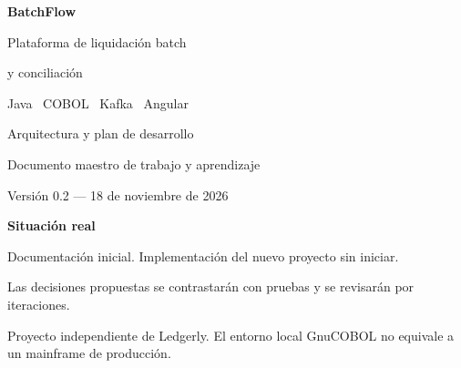 \documentclass[11pt,a4paper,oneside]{report}
\begin{document}
\hypersetup{pageanchor=false}
\begin{titlepage}
\vspace*{18mm}
{\Huge\bfseries\color{brand} BatchFlow\par}
\vspace{8mm}
{\Large Plataforma de liquidación batch\par y conciliación\par}
\vspace{10mm}
{\large Java \textperiodcentered\ COBOL \textperiodcentered\ Kafka \textperiodcentered\ Angular\par}
\vspace{18mm}
{\LARGE Arquitectura y plan de desarrollo\par}
\vspace{6mm}
Documento maestro de trabajo y aprendizaje\par
Versión 0.2 --- 18 de noviembre de 2026\par
\vfill
\textbf{Situación real}\par
Documentación inicial. Implementación del nuevo proyecto sin iniciar.\par
Las decisiones propuestas se contrastarán con pruebas y se revisarán por iteraciones.\par
\vspace{7mm}
Proyecto independiente de Ledgerly. El entorno local GnuCOBOL no equivale a un mainframe de producción.\par
\end{titlepage}
\hypersetup{pageanchor=true}
\tableofcontents
\clearpage
{}








\end{document}
